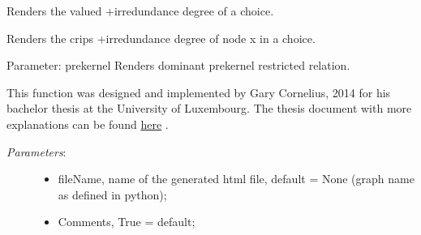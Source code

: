 \documentclass[letterpaper,10pt,english]{sphinxmanual}
\begin{document}
\begin{fulllineitems}
\begin{fulllineitems}
\end{fulllineitems}


\begin{fulllineitems}
\label{techDoc:digraphs.Digraph.domirredval}
Renders the valued +irredundance degree of a choice.

\end{fulllineitems}


\begin{fulllineitems}
\label{techDoc:digraphs.Digraph.domirredx}
Renders the crips +irredundance degree of node x in a choice.

\end{fulllineitems}


\begin{fulllineitems}
\label{techDoc:digraphs.Digraph.domkernelrestrict}
Parameter: prekernel
Renders dominant prekernel restricted relation.

\end{fulllineitems}


\begin{fulllineitems}
\label{techDoc:digraphs.Digraph.exportD3}
This function was designed and implemented by Gary Cornelius, 2014 for his bachelor thesis at the University of Luxembourg. 
The thesis document with more explanations can be found
\href{http://leopold-loewenheim.uni.lu/Digraph3/literature/}{here} .
\begin{description}
\item[{\emph{Parameters}:}] \leavevmode\begin{itemize}
\item {} 
fileName, name of the generated html file, default = None (graph name as defined in python);

\item {} 
Comments, True = default;


\end{itemize}
\end{description}
\end{fulllineitems}
\end{fulllineitems}
\end{document}
